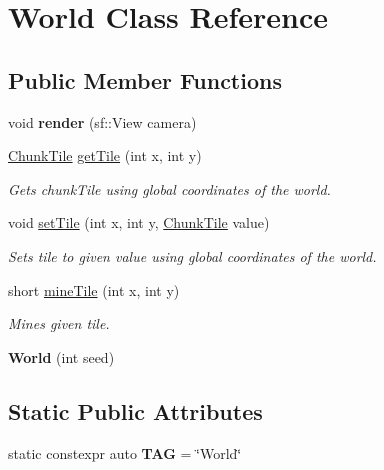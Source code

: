 \hypertarget{classWorld}{\section{World Class Reference}
\label{classWorld}
}
\subsection*{Public Member Functions}
\begin{DoxyCompactItemize}
\item 
\hypertarget{classWorld_a4ed73f6a1537aee3fa26a82de6a35437}{void {\bfseries render} (sf\-::\-View camera)}\label{classWorld_a4ed73f6a1537aee3fa26a82de6a35437}

\item 
\hypertarget{classWorld_ad8d693762cae3c31ec90fef9b44b97bf}{\hyperlink{classChunkTile}{Chunk\-Tile} \hyperlink{classWorld_ad8d693762cae3c31ec90fef9b44b97bf}{get\-Tile} (int x, int y)}\label{classWorld_ad8d693762cae3c31ec90fef9b44b97bf}

\begin{DoxyCompactList}\small\item\em Gets chunk\-Tile using global coordinates of the world. \end{DoxyCompactList}\item 
\hypertarget{classWorld_a9d374f8600da3aa484e48a5887772340}{void \hyperlink{classWorld_a9d374f8600da3aa484e48a5887772340}{set\-Tile} (int x, int y, \hyperlink{classChunkTile}{Chunk\-Tile} value)}\label{classWorld_a9d374f8600da3aa484e48a5887772340}

\begin{DoxyCompactList}\small\item\em Sets tile to given value using global coordinates of the world. \end{DoxyCompactList}\item 
short \hyperlink{classWorld_a1bbfac1b517a991c30aa96b57d04d265}{mine\-Tile} (int x, int y)
\begin{DoxyCompactList}\small\item\em Mines given tile. \end{DoxyCompactList}\item 
\hypertarget{classWorld_a4598832293e050abba792d1b4367a368}{{\bfseries World} (int seed)}\label{classWorld_a4598832293e050abba792d1b4367a368}

\end{DoxyCompactItemize}
\subsection*{Static Public Attributes}
\begin{DoxyCompactItemize}
\item 
\hypertarget{classWorld_a9ebf0ccc9a330d5f3e4ed8401d64e5f6}{static constexpr auto {\bfseries T\-A\-G} = \char`\"{}World\char`\"{}}\label{classWorld_a9ebf0ccc9a330d5f3e4ed8401d64e5f6}

\end{DoxyCompactItemize}


